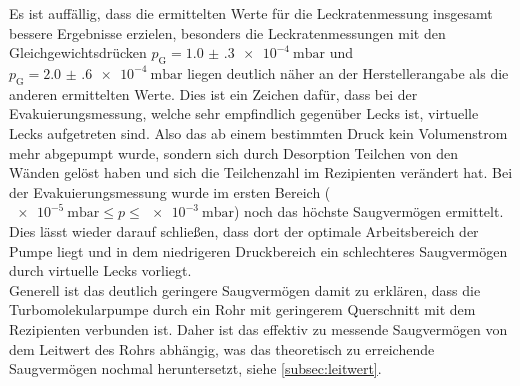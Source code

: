 \noindent Es ist auffällig, dass die ermittelten Werte für die Leckratenmessung insgesamt bessere Ergebnisse erzielen, besonders die Leckratenmessungen
mit den Gleichgewichtsdrücken $p_\text{G} = \SI{1.0(3)e-4}{\milli\bar}$ und $p_\text{G} = \SI{2.0(6)e-4}{\milli\bar}$ liegen deutlich näher an der Herstellerangabe als die anderen ermittelten Werte. 
Dies ist ein Zeichen dafür, dass bei der Evakuierungsmessung, welche sehr empfindlich gegenüber Lecks ist, virtuelle Lecks aufgetreten sind. Also das ab einem bestimmten Druck 
kein Volumenstrom mehr abgepumpt wurde, sondern sich durch Desorption Teilchen von den Wänden gelöst haben und sich die Teilchenzahl im Rezipienten verändert hat.
Bei der Evakuierungsmessung wurde im ersten Bereich ($\SI{e-5}{\milli\bar} \leq p \leq \SI{e-3}{\milli\bar}$) noch das höchste Saugvermögen ermittelt.
Dies lässt wieder darauf schließen, dass dort der optimale Arbeitsbereich der Pumpe liegt und in dem niedrigeren Druckbereich ein schlechteres Saugvermögen durch virtuelle Lecks vorliegt. \\
Generell ist das deutlich geringere Saugvermögen damit zu erklären, dass die Turbomolekularpumpe durch ein Rohr mit geringerem Querschnitt mit dem Rezipienten verbunden ist. Daher ist das 
effektiv zu messende Saugvermögen von dem Leitwert des Rohrs abhängig, was das theoretisch zu erreichende Saugvermögen nochmal heruntersetzt, siehe \autoref{subsec:leitwert}. 

